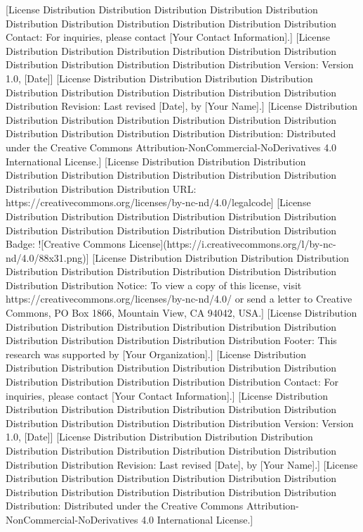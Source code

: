[License Distribution Distribution Distribution Distribution Distribution Distribution Distribution Distribution Distribution Distribution Distribution Contact: For inquiries, please contact [Your Contact Information].]  
[License Distribution Distribution Distribution Distribution Distribution Distribution Distribution Distribution Distribution Distribution Distribution Version: Version 1.0, [Date]]  
[License Distribution Distribution Distribution Distribution Distribution Distribution Distribution Distribution Distribution Distribution Distribution Revision: Last revised [Date], by [Your Name].]  
[License Distribution Distribution Distribution Distribution Distribution Distribution Distribution Distribution Distribution Distribution Distribution Distribution: Distributed under the Creative Commons Attribution-NonCommercial-NoDerivatives 4.0 International License.]  
[License Distribution Distribution Distribution Distribution Distribution Distribution Distribution Distribution Distribution Distribution Distribution Distribution URL: https://creativecommons.org/licenses/by-nc-nd/4.0/legalcode]  
[License Distribution Distribution Distribution Distribution Distribution Distribution Distribution Distribution Distribution Distribution Distribution Distribution Badge: ![Creative Commons License](https://i.creativecommons.org/l/by-nc-nd/4.0/88x31.png)]  
[License Distribution Distribution Distribution Distribution Distribution Distribution Distribution Distribution Distribution Distribution Distribution Distribution Notice: To view a copy of this license, visit https://creativecommons.org/licenses/by-nc-nd/4.0/ or send a letter to Creative Commons, PO Box 1866, Mountain View, CA 94042, USA.]  
[License Distribution Distribution Distribution Distribution Distribution Distribution Distribution Distribution Distribution Distribution Distribution Distribution Footer: This research was supported by [Your Organization].]  
[License Distribution Distribution Distribution Distribution Distribution Distribution Distribution Distribution Distribution Distribution Distribution Distribution Contact: For inquiries, please contact [Your Contact Information].]  
[License Distribution Distribution Distribution Distribution Distribution Distribution Distribution Distribution Distribution Distribution Distribution Distribution Version: Version 1.0, [Date]]  
[License Distribution Distribution Distribution Distribution Distribution Distribution Distribution Distribution Distribution Distribution Distribution Distribution Revision: Last revised [Date], by [Your Name].]  
[License Distribution Distribution Distribution Distribution Distribution Distribution Distribution Distribution Distribution Distribution Distribution Distribution Distribution: Distributed under the Creative Commons Attribution-NonCommercial-NoDerivatives 4.0 International License.]  
